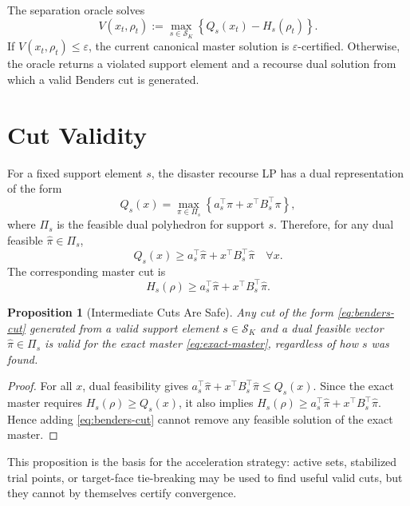 \documentclass[11pt]{article}
\newtheorem{proposition}{Proposition}
\newcommand{\Sset}{\mathcal S}
\newcommand{\eps}{\varepsilon}
\begin{document}
The separation oracle solves
\begin{equation}
    V(x_t,\rho_t)
    :=
    \max_{s\in\Sset_K}
    \left\{Q_s(x_t)-H_s(\rho_t)\right\}.
    \label{eq:full-separation}
\end{equation}
If $V(x_t,\rho_t)\le\eps$, the current canonical master solution is
$\eps$-certified.  Otherwise, the oracle returns a violated support element and
a recourse dual solution from which a valid Benders cut is generated.

\section{Cut Validity}

For a fixed support element $s$, the disaster recourse LP has a dual
representation of the form
\begin{equation}
    Q_s(x)
    =
    \max_{\pi\in\Pi_s}
    \left\{
    a_s^\top \pi + x^\top B_s^\top\pi
    \right\},
    \label{eq:recourse-dual}
\end{equation}
where $\Pi_s$ is the feasible dual polyhedron for support $s$.  Therefore, for
any dual feasible $\widehat\pi\in\Pi_s$,
\begin{equation}
    Q_s(x)\ge
    a_s^\top \widehat\pi + x^\top B_s^\top\widehat\pi
    \quad \forall x .
\end{equation}
The corresponding master cut is
\begin{equation}
    H_s(\rho)
    \ge
    a_s^\top \widehat\pi + x^\top B_s^\top\widehat\pi .
    \label{eq:benders-cut}
\end{equation}

\begin{proposition}[Intermediate Cuts Are Safe]
Any cut of the form \eqref{eq:benders-cut} generated from a valid support
element $s\in\Sset_K$ and a dual feasible vector $\widehat\pi\in\Pi_s$ is valid
for the exact master \eqref{eq:exact-master}, regardless of how $s$ was found.
\end{proposition}

\begin{proof}
For all $x$, dual feasibility gives
$a_s^\top \widehat\pi+x^\top B_s^\top\widehat\pi\le Q_s(x)$.  Since the exact
master requires $H_s(\rho)\ge Q_s(x)$, it also implies
$H_s(\rho)\ge a_s^\top \widehat\pi+x^\top B_s^\top\widehat\pi$.  Hence adding
\eqref{eq:benders-cut} cannot remove any feasible solution of the exact master.
\end{proof}

This proposition is the basis for the acceleration strategy: active sets,
stabilized trial points, or target-face tie-breaking may be used to find useful
valid cuts, but they cannot by themselves certify convergence.
\end{document}

